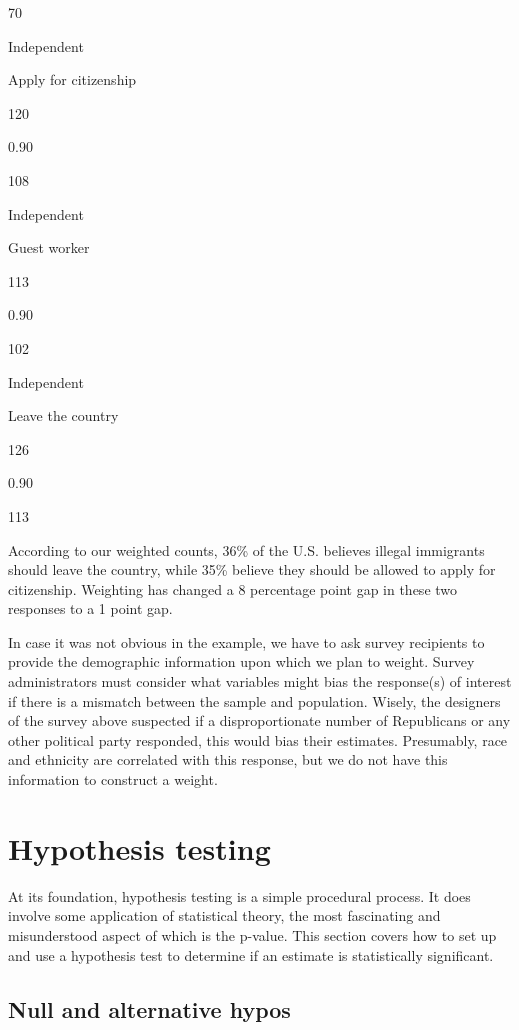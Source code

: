 \documentclass[
]{book}
\begin{document}
70

Independent

Apply for citizenship

120

0.90

108

Independent

Guest worker

113

0.90

102

Independent

Leave the country

126

0.90

113

According to our weighted counts, 36\% of the U.S. believes illegal immigrants should leave the country, while 35\% believe they should be allowed to apply for citizenship. Weighting has changed a 8 percentage point gap in these two responses to a 1 point gap.

In case it was not obvious in the example, we have to ask survey recipients to provide the demographic information upon which we plan to weight. Survey administrators must consider what variables might bias the response(s) of interest if there is a mismatch between the sample and population. Wisely, the designers of the survey above suspected if a disproportionate number of Republicans or any other political party responded, this would bias their estimates. Presumably, race and ethnicity are correlated with this response, but we do not have this information to construct a weight.

\hypertarget{hypothesis-testing}{%
\section{Hypothesis testing}\label{hypothesis-testing}}

At its foundation, hypothesis testing is a simple procedural process. It does involve some application of statistical theory, the most fascinating and misunderstood aspect of which is the p-value. This section covers how to set up and use a hypothesis test to determine if an estimate is statistically significant.

\hypertarget{null-and-alternative-hypos}{%
\subsection{Null and alternative hypos}\label{null-and-alternative-hypos}}
\end{document}
